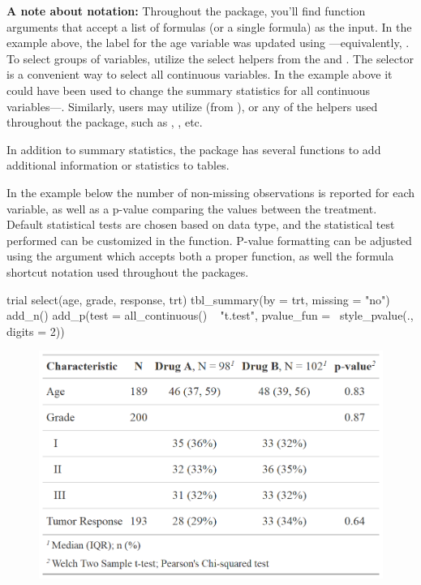 \textbf{A note about notation:}
Throughout the  package, you'll find function arguments that accept a list of formulas (or a single formula) as the input.
In the example above, the label for the age variable was updated using ---equivalently, .
To select groups of variables, utilize the select helpers from the  and .
The  selector is a convenient way to select all continuous variables.
In the example above it could have been used to change the summary statistics for all continuous variables---. 
Similarly, users may utilize  (from ), or any of the  helpers used throughout the  package, such as , , etc.

In addition to summary statistics, the  package has several functions to add additional information or statistics to  tables.



In the example below the number of non-missing observations is reported for each variable, as well as a p-value comparing the values between the treatment.
Default statistical tests are chosen based on data type, and the statistical test performed can be customized in the  function.
P-value formatting can be adjusted using the  argument which accepts both a proper function, as well the formula shortcut notation used throughout the  packages.

\newpage
\begin{example}
trial %
  select(age, grade, response, trt) %
  tbl_summary(by = trt, missing = "no") %
  add_n() %
  add_p(test = all_continuous() ~ "t.test",
        pvalue_fun = ~style_pvalue(., digits = 2))

\end{example}
\begin{figure}[h!]
  \includegraphics[scale=0.35]{summary_plus_plus.png}
  \centering
\end{figure}

